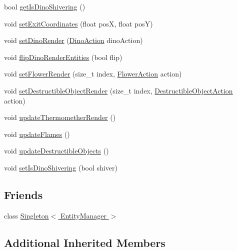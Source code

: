\begin{DoxyCompactItemize}
\item 
bool \hyperlink{class_symp_1_1_entity_manager_a52b4c798c895aa7f77ce228107f1d6c8}{get\-Is\-Dino\-Shivering} ()
\item 
void \hyperlink{class_symp_1_1_entity_manager_abc616919576f3f934b0a3a894fbf73ce}{set\-Exit\-Coordinates} (float pos\-X, float pos\-Y)
\item 
void \hyperlink{class_symp_1_1_entity_manager_af4c4ae3b2fbbaf6d8230a581928533a5}{set\-Dino\-Render} (\hyperlink{namespace_symp_a303925db810fa122d017c4001bfa5e88}{Dino\-Action} dino\-Action)
\item 
void \hyperlink{class_symp_1_1_entity_manager_aee82c43f4077bafd9bab82afebde8c52}{flip\-Dino\-Render\-Entities} (bool flip)
\item 
void \hyperlink{class_symp_1_1_entity_manager_a0688e53ec03ddb4175b373575c5e0054}{set\-Flower\-Render} (size\-\_\-t index, \hyperlink{namespace_symp_a2b868de1f6f86f455f39dfa63028859c}{Flower\-Action} action)
\item 
void \hyperlink{class_symp_1_1_entity_manager_a97c9577c4f459e3a08465caf45f25853}{set\-Destructible\-Object\-Render} (size\-\_\-t index, \hyperlink{namespace_symp_a9f891c0e98f2864e7b687d741bf032d7}{Destructible\-Object\-Action} action)
\item 
void \hyperlink{class_symp_1_1_entity_manager_a1dd7c6251093f5d6cd64460916c8cbbb}{update\-Thermomether\-Render} ()
\item 
void \hyperlink{class_symp_1_1_entity_manager_a4df159993061bc3098f6861f715a17c1}{update\-Flames} ()
\item 
void \hyperlink{class_symp_1_1_entity_manager_af4d70469e46f2c8473aa877e1acff635}{update\-Destructible\-Objects} ()
\item 
void \hyperlink{class_symp_1_1_entity_manager_a555efd00fbf09f062b22f463d49a6e22}{set\-Is\-Dino\-Shivering} (bool shiver)
\end{DoxyCompactItemize}
\subsection*{Friends}
\begin{DoxyCompactItemize}
\item 
class \hyperlink{class_symp_1_1_entity_manager_a275303a889d60f5019ba1b3f2d529c6b}{Singleton$<$ Entity\-Manager $>$}
\end{DoxyCompactItemize}
\subsection*{Additional Inherited Members}


